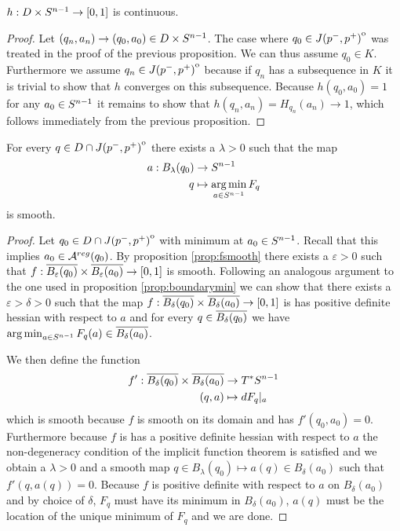 \begin{corollary}
    $h:D\times {S^{n-1}}\to [0,1]$ is continuous.
\end{corollary}
\begin{proof}
    Let $(q_n,a_n)\to (q_0,a_0)\in D\times {S^{n-1}}$. The case where $q_0\in {\kern0ptJ(p^-,p^+)}^{\mathrm{o}}$ was treated in the proof of the previous proposition. We can thus assume $q_0\in K$. Furthermore we assume $q_n \in {\kern0ptJ(p^-,p^+)}^{\mathrm{o}}$ because if $q_n$ has a subsequence in $K$ it is trivial to show that $h$ converges on this subsequence. Because $h(q_0,a_0)=1$ for any $a_0\in {S^{n-1}}$ it remains to show that $h(q_n,a_n)=H_{q_n}(a_n)\to 1$, which follows immediately from the previous proposition.
\end{proof}

\begin{lemma}
    For every $q\in D\cap {\kern0ptJ(p^-,p^+)}^{\mathrm{o}}$ there exists a $\lambda>0$ such that the map 
    \begin{align*}
        a:B_\lambda(q_0)&\to {S^{n-1}}\\
        q&\mapsto \operatorname*{arg\,min}_{a\in {S^{n-1}}} F_q
    \end{align*} is smooth.
\end{lemma}
\begin{proof}
    Let $q_0\in D\cap {\kern0ptJ(p^-,p^+)}^{\mathrm{o}}$ with minimum at $a_0\in {S^{n-1}}$. Recall that this implies $a_0\in {{\mathcal{A}}^{reg}}(q_0)$.
    By proposition \ref{prop:fsmooth} there exists a $\varepsilon>0$ such that $f:{\overline{B_\varepsilon(q_0)}}\times{\overline{B_\varepsilon(a_0)}}\to [0,1]$ is smooth. Following an analogous argument to the one used in proposition \ref{prop:boundarymin} we can show that there exists a $\varepsilon>\delta>0$ such that the map $f:{\overline{B_\delta(q_0)}}\times{\overline{B_\delta(a_0)}}\to [0,1]$ is has positive definite hessian with respect to $a$ and for every $q\in {\overline{B_\delta(q_0)}}$ we have $\operatorname*{arg\,min}_{a\in {S^{n-1}}} F_{q}(a) \in {\overline{B_\delta(a_0)}}$. 

    We then define the function 
    \begin{align*}
        f':{\overline{B_\delta(q_0)}}\times{\overline{B_\delta(a_0)}}&\to T^*{S^{n-1}}\\
        (q,a)&\mapsto dF_q\rvert_a
    \end{align*} which is smooth because $f$ is smooth on its domain and has $f'(q_0,a_0)=0$. Furthermore because $f$ is has a positive definite hessian with respect to $a$ the non-degeneracy condition of the implicit function theorem is satisfied and we obtain a $\lambda>0$ and a smooth map $q\in B_\lambda(q_0)\mapsto a(q)\in B_\delta(a_0)$ such that $f'(q,a(q))=0$. Because $f$ is positive definite with respect to $a$ on $B_\delta(a_0)$ and by choice of $\delta$, $F_q$ must have its minimum in $B_\delta(a_0)$, $a(q)$ must be the location of the unique minimum of $F_q$ and we are done. 
\end{proof}


